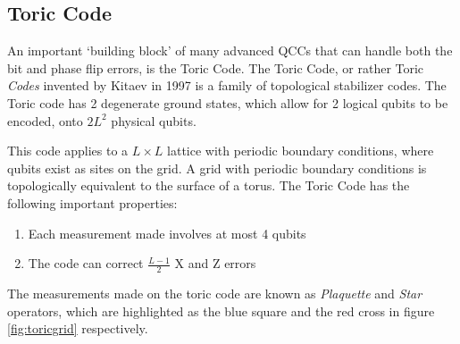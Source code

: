 

\subsection{Toric Code}
An important `building block' of many advanced QCCs that can handle both the bit and phase flip errors, is the Toric Code. The Toric Code, or rather Toric \textit{Codes} invented by Kitaev in 1997 \cite{1997} is a family of topological stabilizer codes. The Toric code has 2 degenerate ground states, which allow for 2 logical qubits to be encoded, onto $2L^2$ physical qubits.

This code applies to a $L \times L$ lattice with periodic boundary conditions, where qubits exist as sites on the grid. A grid with periodic boundary conditions is topologically equivalent to the surface of a torus. The Toric Code has the following important properties:
\begin{enumerate}
	\item Each measurement made involves at most 4 qubits
	\item The code can correct $\frac{L-1}{2}$ X and Z errors
\end{enumerate}
The measurements made on the toric code are known as \textit{Plaquette} and \textit{Star} operators, which are highlighted as the blue square and the red cross in figure \ref{fig:toricgrid} respectively. 

